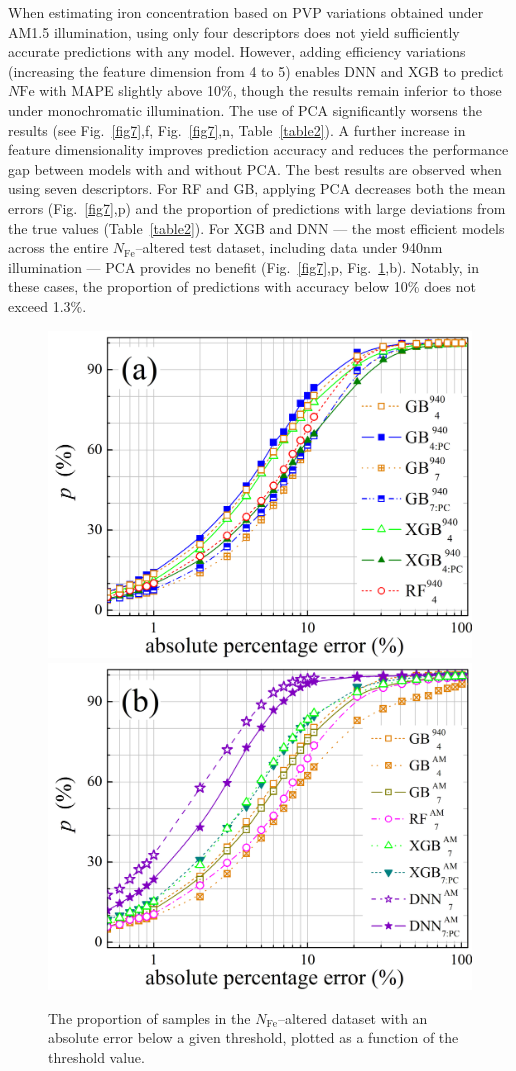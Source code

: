 \documentclass[a4paper,fleqn]{cas-sc}
\begin{document}
When estimating iron concentration based on PVP variations obtained under AM1.5 illumination, 
using only four descriptors does not yield sufficiently accurate predictions with any model.
However, adding efficiency variations (increasing the feature dimension from 4 to 5) 
enables DNN and XGB to predict $N\mathrm{Fe}$ with MAPE slightly above 10\%, 
though the results remain inferior to those under monochromatic illumination.
The use of PCA significantly worsens the results (see Fig.~\ref{fig7},f, Fig.~\ref{fig7},n, Table~\ref{table2}).
A further increase in feature dimensionality improves prediction accuracy and reduces the performance gap between models with and without PCA.
The best results are observed when using seven descriptors.
For RF and GB, applying PCA decreases both the mean errors (Fig.~\ref{fig7},p) 
and the proportion of predictions with large deviations from the true values (Table~\ref{table2}).
For XGB and DNN --- the most efficient models across the entire $N_\mathrm{Fe}$--altered test dataset, 
including data under 940nm illumination --- PCA provides no benefit (Fig.~\ref{fig7},p, Fig.~\ref{fig8},b).
Notably, in these cases, the proportion of predictions with accuracy below 10\% does not exceed 1.3\%.

\begin{figure}
  \centering
     \includegraphics[width=0.4\linewidth]{Fig8a.png}
     \includegraphics[width=0.4\linewidth]{Fig8b.png}
    \caption{The proportion of samples in the $N_\mathrm{Fe}$--altered dataset with an absolute error below a given threshold, plotted as a function of the threshold value.
}\label{fig8}
\end{figure}
\end{document}
